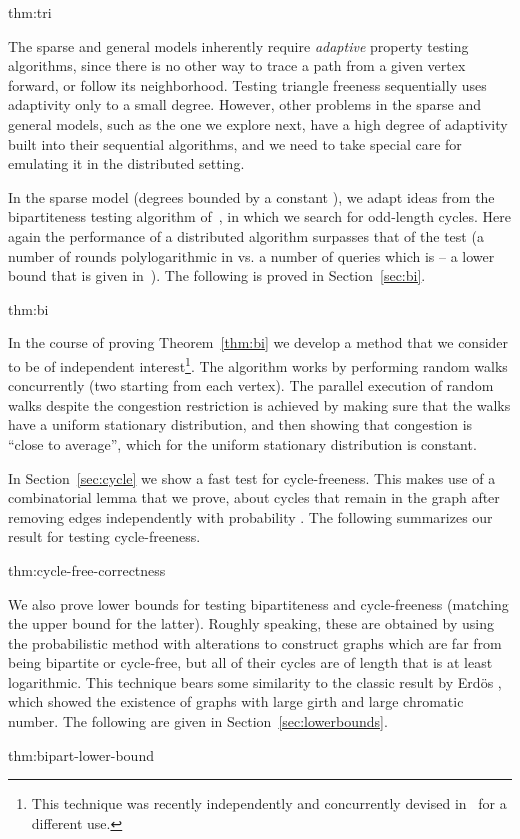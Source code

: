 \documentclass[11pt]{article}
\newenvironment{theorem-repeat}[1]{\begin{trivlist}
		\item[\hspace{\labelsep}{\bf\noindent Theorem \ref{#1} }]\em }{\end{trivlist}}
\begin{document}
\begin{theorem-repeat}{thm:tri}
\ThmTri
\end{theorem-repeat}

The sparse and general models inherently require \emph{adaptive} property testing algorithms, since there is no other way to trace a path from a given vertex forward, or follow its neighborhood. Testing triangle freeness sequentially uses adaptivity only to a small degree.
However, other problems in the sparse and general models, such as the one we explore next, have a high degree of adaptivity built into their sequential algorithms, and we need to take special care for emulating it in the distributed setting.

In the sparse model (degrees bounded by a constant ), we adapt ideas from the bipartiteness testing algorithm of~\cite{GR99}, in which we search for odd-length cycles. Here again the performance of a distributed algorithm surpasses that of the test (a number of rounds polylogarithmic in  vs. a number of queries which is  -- a lower bound that is given in~\cite{GoldreichR02}). The following is proved in Section~\ref{sec:bi}.

\begin{theorem-repeat}{thm:bi}
\ThmBi
\end{theorem-repeat}

In the course of proving Theorem~\ref{thm:bi} we develop a method that we consider to be of independent interest\footnote{This technique was recently independently and concurrently devised in~\cite{GhaffariKS16} for a different use.}. The algorithm works by performing  random walks concurrently (two starting from each vertex). The parallel execution of random walks despite the congestion restriction is achieved by making sure that the walks have a uniform stationary distribution, and then showing that congestion is ``close to average'', which for the uniform stationary distribution is constant.

In Section~\ref{sec:cycle} we show a fast test for cycle-freeness. This makes use of a combinatorial lemma that we prove, about cycles that remain in the graph after removing edges independently with probability . 
The following summarizes our result for testing cycle-freeness.
\begin{theorem-repeat}{thm:cycle-free-correctness}
\ThmCycle
\end{theorem-repeat}

We also prove lower bounds for testing bipartiteness and cycle-freeness (matching the upper bound for the latter). Roughly speaking, these are obtained by using the probabilistic method with alterations to construct graphs which are far from being bipartite or cycle-free, but all of their cycles are of length that is at least logarithmic. This technique bears some similarity to the classic result by Erd{\"o}s \cite{erdos1959graph}, which showed the existence of graphs with large girth and large chromatic number. The following are given in Section~\ref{sec:lowerbounds}.
\begin{theorem-repeat}{thm:bipart-lower-bound}
\ThmLBBi
\end{theorem-repeat}
\end{document}

